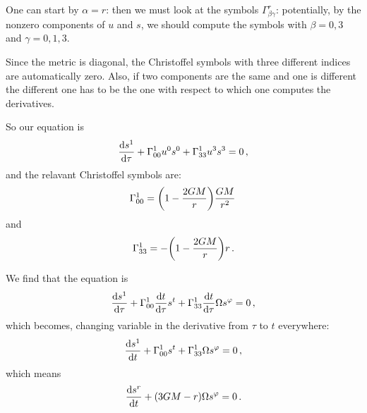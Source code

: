 \documentclass[main.tex]{subfiles}
\begin{document}
One can start by \(\alpha = r\): then we must look at the symbols \(\Gamma^{r}_{\beta \gamma }\): potentially, by the nonzero components of \(u\) and \(s\), we should compute the symbols with \(\beta = 0, 3 \) and \(\gamma = 0, 1, 3\). 

Since the metric is diagonal, the Christoffel symbols with three different indices are automatically zero.
Also, if two components are the same and one is different the different one has to be the one with respect to which one computes the derivatives. 

So our equation is 
%
\begin{align}
  \dv{s^{1}}{\tau } + \Gamma^{1}_{00} u^{0} s^{0} 
  + \Gamma^{1}_{33} u^{3} s^{3} = 0
\,,
\end{align}
%
and the relavant Christoffel symbols are: 
%
\begin{align}
  \Gamma^{1}_{00} = \qty(1 - \frac{2GM}{r}) \frac{GM}{r^2}
\,
\end{align}
%
and 
%
\begin{align}
  \Gamma^{1}_{33} = - \qty(1 - \frac{2GM}{r})r
\,.
\end{align}

We find that the equation is 
%
\begin{align}
  \dv{s^{1}}{\tau } + \Gamma^{1}_{00} \dv{t}{\tau } s^{t}
  + \Gamma^{1}_{33} \dv{t}{\tau } \Omega s^{\varphi } = 0
\,,
\end{align}
%
which becomes, changing variable in the derivative from \(\tau \) to \(t\) everywhere: 
%
\begin{align}
\dv{s^{1}}{t} + \Gamma^{1}_{00}  s^{t}
+ \Gamma^{1}_{33}  \Omega s^{\varphi } = 0
  \,,
\end{align}
%
which means 
%
\begin{align}
  \dv{s^{r}}{t} + \qty(3GM - r)\Omega s^{\varphi }= 0
\,.
\end{align}
\end{document}
